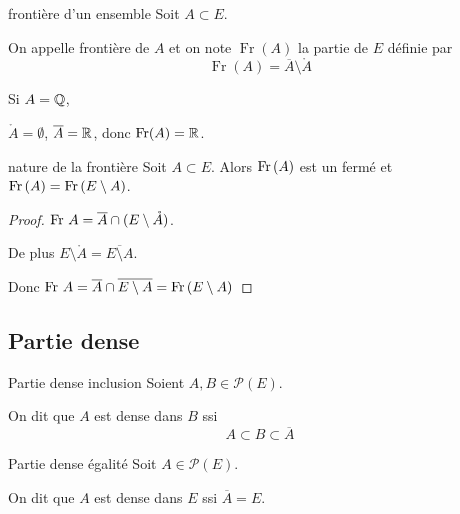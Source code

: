 \begin{definition}{frontière d'un ensemble}{}
    Soit $A \subset E$. 

    On appelle frontière de $A$ et on note $\operatorname{Fr}(A)$ la partie de $E$ définie 
    par 
    $$ \operatorname{Fr}(A) = \overline A \setminus \mathring A$$
\end{definition}

\begin{exemple}
    Si $A = \mathbb{Q}$, 

    $\mathring A = \emptyset$, $\overline A = \mathbb{R}$, donc $\operatorname{Fr}(A) = \mathbb{R}$.
\end{exemple}


\begin{proposition}{nature de la frontière}{}
    Soit $A \subset E$. Alors $\operatorname{Fr} \,(A)$ est un fermé et $\operatorname{Fr} \,(A) = \operatorname{Fr} \,(E \setminus A)$.
\end{proposition}

\begin{proof}
    $\operatorname{Fr} \, A = \overline A \cap (E \setminus \mathring A)$. 

    De plus $E \setminus \mathring A = \overline{E \setminus A}$.

    Donc $\operatorname{Fr} \, A = \overline A \cap \overline{E \setminus A} = \operatorname{Fr} \, (E \setminus A)$ 
\end{proof}

\subsection{Partie dense }

\begin{definitionnt}{Partie dense inclusion}{}
    Soient $A, B \in \mathscr P(E)$.

    On dit que $A$ est dense dans $B$ ssi 
    $$A \subset B \subset \overline A$$
\end{definitionnt}

\begin{definitionnt}{Partie dense égalité}{}
    Soit $A \in \mathscr P(E)$.

    On dit que $A$ est dense dans $E$ ssi $\overline A = E$.
\end{definitionnt}

